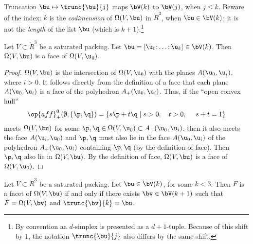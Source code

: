 Truncation $\bu\mapsto\trunc{\bu}{j}$ maps $\bV(k)$ to $\bV(j)$, when
$j\le k$.  Beware of the index: $k$ is the {\it codimension} of
$\Omega(V,\bu)$ in $\ring{R}^3$, when $\bu\in \bV(k)$; it is not the
{\it length} of the list $\bu$ (which is $k+1$).\footnote{By
  convention aa $d$-simplex is presented as a $d+1$-tuple.  Because of
  this shift by $1$, the notation $\trunc{\bu}{j}$ also differs by the
  same shift.}


\begin{lemma}[]\label{lemma:omega-face}  
Let $V\subset\ring{R}^3$ be a saturated packing.
Let $\bu=[\u_0;\ldots;\u_{k}]\in \bV(k)$.  
Then $\Omega(V,\bu)$ is a face of $\Omega(V,\u_0)$.
\end{lemma}

\begin{proof} $\Omega(V,\bu)$ is the intersection of $\Omega(V,\u_0)$ with
the planes $A(\u_0,\u_i)$, where $i>0$.  
It follows directly from the definition of a face that each plane
$A(\u_0,\u_i)$ is a face of the polyhedron $A_+(\u_0,\u_i)$.  Thus, if
the ``open convex hull''
\begin{displaymath} 
\op{aff}^0_+(\emptyset,\{\p,\q\}) = \{ s \p + t \q \mid s>0,\quad t>0,~\quad s + t = 1\}
\end{displaymath} 
meets
$\Omega(V,\bu)$ for some $\p,\q\in \Omega(V,\u_0)\subset
A_+(\u_0,\u_i)$, then it also meets the face $A(\u_i,\u_0)$ and $\p,\q$
must also lie in the face $A(\u_0,\u_i)$ of the polyhedron
$A_+(\u_0,\u_i)$ containing $\p,\q$ (by
the definition of face).  Then $\p,\q$ also lie in
$\Omega(V,\bu)$.  By the definition of face, $\Omega(V,\bu)$ is a face
of $\Omega(V,\u_0)$.
\end{proof}

\begin{lemma}[]\label{lemma:omega-facet} 
  Let $V\subset\ring{R}^3$ be a saturated packing.  Let $\bu\in
  \bV(k)$, for some $k<3$.  Then $F$ is a facet of $\Omega(V,\bu)$ if
  and only if there exists $\bv\in \bV(k+1)$ such that $F =
  \Omega(V,\bv)$ and $\trunc{\bv}{k} = \bu$.
\end{lemma}

